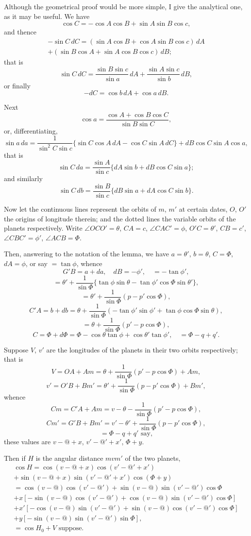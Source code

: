 \documentclass[11pt,a4paper]{article}
\theoremstyle{plain}
\theoremstyle{definition}
\theoremstyle{remark}
\begin{document}
Although the geometrical proof would be more simple, I give the analytical one, as it may be useful. We have
\[
\cos C = -\cos A\cos B + \sin A\sin B\cos c,
\]
and thence
\begin{multline*}
-\sin C\,dC = (\sin A\cos B + \cos A\sin B\cos c)\,dA\\
+ (\sin B\cos A + \sin A\cos B\cos c)\,dB;
\end{multline*}
that is
\[
\sin C\,dC = \frac{\sin B\sin c}{\sin a}\,dA + \frac{\sin A\sin c}{\sin b}\,dB,
\]
or finally
\[
-dC = \cos b\,dA + \cos a\,dB.
\]

Next
\[
\cos a = \frac{\cos A + \cos B\cos C}{\sin B\sin C},
\]
or, differentiating,
\[
\sin a\,da = \frac{1}{\sin^{2}C\sin c}\{\sin C\cos A\,dA - \cos C\sin A\,dC\} + dB\cos C\sin A\cos a,
\]
that is
\[
\sin C\,da = \frac{\sin A}{\sin c}\{dA\sin b + dB\cos C\sin a\};
\]
and similarly
\[
\sin C\,db = \frac{\sin B}{\sin c}\{dB\sin a + dA\cos C\sin b\}.
\]

Now let the continuous lines represent the orbits of $m$, $m'$ at certain dates, $O$, $O'$ the origins of longitude therein; and the dotted lines the variable orbits of the planets respectively. Write $\angle OCO'=\theta$, $CA=c$, $\angle CAC'=\phi$, $O'C=\theta'$, $CB=c'$, $\angle CBC'=\phi'$, $\angle ACB=\Phi$.

Then, answering to the notation of the lemma, we have $a=\theta'$, $b=\theta$, $C=\Phi$, $dA=\phi$, or say $=\tan\phi$, whence
\[
G'B = a + da, \quad dB = -\phi', \quad = -\tan\phi',
\]
\[
= \theta' + \frac{1}{\sin\Phi}\{\tan\phi\sin\theta - \tan\phi'\cos\Phi\sin\theta'\},
\]
\[
= \theta' + \frac{1}{\sin\Phi}(p - p'\cos\Phi),
\]
\[
C'A = b + db = \theta + \frac{1}{\sin\Phi}(-\tan\phi'\sin\phi' + \tan\phi\cos\Phi\sin\theta),
\]
\[
= \theta + \frac{1}{\sin\Phi}(p' - p\cos\Phi),
\]
\[
C = \Phi + d\Phi = \Phi - \cos\theta\tan\phi + \cos\theta'\tan\phi', \quad = \Phi - q + q'.
\]

Suppose $V$, $v'$ are the longitudes of the planets in their two orbits respectively; that is
\[
V = OA + Am = \theta + \frac{1}{\sin\Phi}(p'-p\cos\Phi) + Am,
\]
\[
v' = O'B + Bm' = \theta' + \frac{1}{\sin\Phi}(p-p'\cos\Phi) + Bm',
\]
whence
\[
Cm = C'A + Am = v - \theta - \frac{1}{\sin\Phi}(p'-p\cos\Phi),
\]
\[
Cm' = G'B + Bm' = v' - \theta' + \frac{1}{\sin\Phi}(p-p'\cos\Phi),
\]
\[
= \Phi - q + q' \text{ say,}
\]
these values are $v-@+x$, $v'-@'+x'$, $\Phi+y$.

Then if $H$ is the angular distance $mvm'$ of the two planets,
\begin{multline*}
\cos H = \cos(v-@+x)\cos(v'-@'+x')\\
+ \sin(v-@+x)\sin(v'-@'+x')\cos(\Phi+y)\\
= \cos(v-@)\cos(v'-@') + \sin(v-@)\sin(v'-@')\cos\Phi\\
+ x[-\sin(v-@)\cos(v'-@') + \cos(v-@)\sin(v'-@')\cos\Phi]\\
+ x'[-\cos(v-@)\sin(v'-@') + \sin(v-@)\cos(v'-@')\cos\Phi]\\
+ y[-\sin(v-@)\sin(v'-@')\sin\Phi],\\
= \cos H_{0} + V \text{ suppose.}
\end{multline*}
\end{document}
